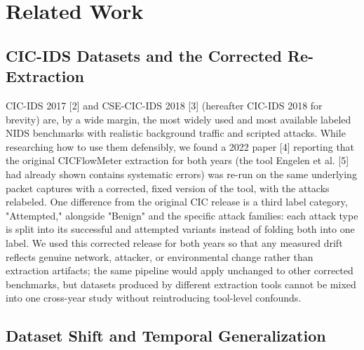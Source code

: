 \documentclass[conference]{IEEEtran}
\begin{document}
\section{Related Work}

\subsection{CIC-IDS Datasets and the Corrected Re-Extraction}

CIC-IDS 2017 [2] and CSE-CIC-IDS 2018 [3] (hereafter CIC-IDS 2018 for brevity) are, by a wide margin, the most widely used and most available labeled NIDS benchmarks with realistic background traffic and scripted attacks. While researching how to use them defensibly, we found a 2022 paper [4] reporting that the original CICFlowMeter extraction for both years (the tool Engelen et al. [5] had already shown contains systematic errors) was re-run on the same underlying packet captures with a corrected, fixed version of the tool, with the attacks relabeled. One difference from the original CIC release is a third label category, "Attempted," alongside "Benign" and the specific attack families: each attack type is split into its successful and attempted variants instead of folding both into one label. We used this corrected release for both years so that any measured drift reflects genuine network, attacker, or environmental change rather than extraction artifacts; the same pipeline would apply unchanged to other corrected benchmarks, but datasets produced by different extraction tools cannot be mixed into one cross-year study without reintroducing tool-level confounds.
\par\medskip

\subsection{Dataset Shift and Temporal Generalization}
\end{document}

